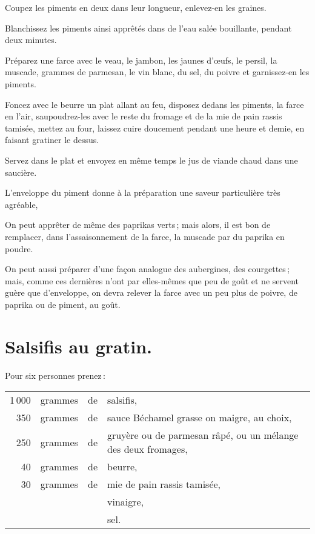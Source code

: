Coupez les piments en deux dans leur longueur, enlevez-en les graines.

Blanchissez les piments ainsi apprêtés dans de l'eau salée bouillante, pendant
deux minutes.

Préparez une farce avec le veau, le jambon, les jaunes d'œufs, le persil, la
muscade, {\mmm} grammes de parmesan, le vin blanc, du sel, du poivre et
garnissez-en les piments.

Foncez avec le beurre un plat allant au feu, disposez dedans les piments, la
farce en l'air, saupoudrez-les avec le reste du fromage et de la mie de pain
rassis tamisée, mettez au four, laissez cuire doucement pendant une heure et
demie, en faisant gratiner le dessus.

Servez dans le plat et envoyez en même temps le jus de viande chaud dans une
saucière.

L'enveloppe du piment donne à la préparation une saveur particulière très
agréable,

\sk

On peut apprêter de même des paprikas verts ; mais alors, il est bon de
remplacer, dans l’assaisonnement de la farce, la muscade par du paprika en
poudre.

\sk

On peut aussi préparer d'une façon analogue des aubergines, des courgettes ;
mais, comme ces dernières n'ont par elles-mêmes que peu de goût et ne servent
guère que d'enveloppe, on devra relever la farce avec un peu plus de poivre, de
paprika ou de piment, au goût.

\section*{\centering Salsifis au gratin.}
{}

Pour six personnes prenez :

\footnotesize
\begin{longtable}{rrrp{16em}}
  1 000 & grammes & de & salsifis,                                                                        \\
    350 & grammes & de & sauce Béchamel grasse on maigre, au choix,                                       \\
    250 & grammes & de & gruyère ou de parmesan râpé, ou un mélange des deux fromages,                    \\
     40 & grammes & de & beurre,                                                                          \\
     30 & grammes & de & mie de pain rassis tamisée,                                                      \\
        &         &    & vinaigre,                                                                        \\
        &         &    & sel.                                                                             \\
\end{longtable}
\normalsize


